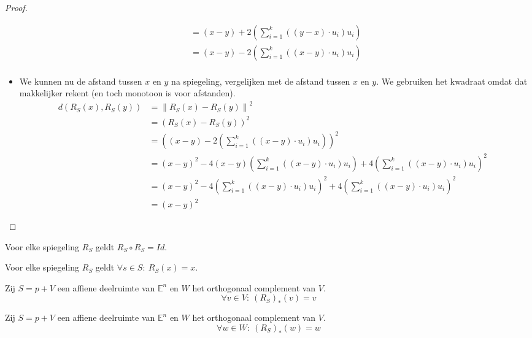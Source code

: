 \documentclass[main.tex]{subfiles}
\begin{document}
\begin{st}
\begin{proof}
\begin{itemize}
\[\begin{array}{rll}
                           &= (x-y) + 2\left(\sum_{i=1}^{k}((y-x)\cdot u_{i} )u_{i}\right) &\\
                           &= (x-y) - 2\left(\sum_{i=1}^{k}((x-y)\cdot u_{i} )u_{i}\right) &\\
      \end{array}
      \]
    \item We kunnen nu de afstand tussen $x$ en $y$ na spiegeling, vergelijken met de afstand tussen $x$ en $y$.
      We gebruiken het kwadraat omdat dat makkelijker rekent (en toch monotoon is voor afstanden).
      \[
      \begin{array}{rll}
        d(R_{S}(x),R_{S}(y)) &= \left\| R_{S}(x) - R_{S}(y)\right\|^{2} & \\
                            &= (R_{S}(x) - R_{S}(y))^{2} &\\
                            &= \left((x-y) - 2\left(\sum_{i=1}^{k}((x-y)\cdot u_{i} )u_{i}\right)\right)^{2} &\\
                            &= (x-y)^{2} -4(x-y)\left(\sum_{i=1}^{k}((x-y)\cdot u_{i} )u_{i}\right) + 4\left(\sum_{i=1}^{k}((x-y)\cdot u_{i} )u_{i}\right)^{2} &\\
                            &= (x-y)^{2} -4\left(\sum_{i=1}^{k}((x-y)\cdot u_{i} )u_{i}\right)^{2} + 4\left(\sum_{i=1}^{k}((x-y)\cdot u_{i} )u_{i}\right)^{2} &\\
                            &= (x-y)^{2}
      \end{array}
      \]
    \end{itemize}
  \end{proof}
\end{st}

\begin{st}
  Voor elke spiegeling $R_{S}$ geldt $R_{S} \circ R_{S} = Id$.
\end{st}

\begin{st}
  Voor elke spiegeling $R_{S}$ geldt $\forall s \in S:\ R_{S}(x) = x$.
\end{st}

\begin{lem}
  Zij $S=p+V$ een affiene deelruimte van $\mathbb{E}^{n}$ en $W$ het orthogonaal complement van $V$.
  \[ \forall v\in V:\ (R_{S})_{*}(v) = v \]
\end{lem}

\begin{lem}
  Zij $S=p+V$ een affiene deelruimte van $\mathbb{E}^{n}$ en $W$ het orthogonaal complement van $V$.
  \[ \forall w\in W:\ (R_{S})_{*}(w) = w \]
\end{lem}
\end{document}
